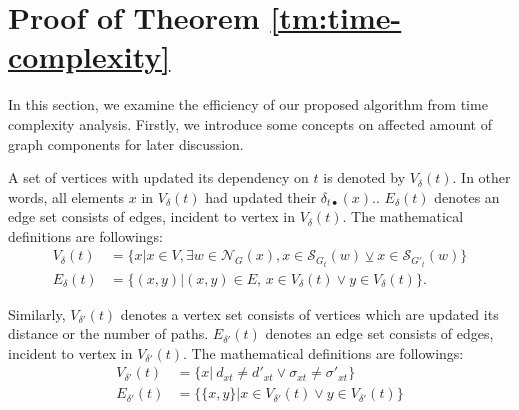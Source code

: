 \section*{Proof of Theorem \ref{tm:time-complexity}}
In this section, we examine the efficiency of our proposed algorithm from time complexity analysis.
Firstly, we introduce some concepts on affected amount of graph components for later discussion.

\begin{definition}
  A set of vertices with updated its dependency on $t$ is denoted by $V_\delta(t)$. In other words, all elements $x$ in $V_\delta(t)$ had updated their $\delta_{t\bullet}(x)$..
  $E_\delta(t)$ denotes an edge set consists of edges, incident to vertex in $V_\delta(t)$.
  The mathematical definitions are followings:
  \begin{equation*}
    \begin{aligned}
      V_\delta(t)&=\{x|x\in V,\exists w\in\mathcal{N}_G(x),
      x\in\mathcal{S}_{G_t}(w)\veebar x\in\mathcal{S}_{G'_t}(w)\}\\
      E_\delta(t)&=\{(x,y)|(x,y)\in E,\,x\in V_\delta(t)\lor y\in V_\delta(t)\}.
    \end{aligned}
  \end{equation*}

  Similarly, $V_{\delta'}(t)$ denotes a vertex set consists of vertices which are updated its distance or the number of paths.
  $E_{\delta'}(t)$ denotes an edge set consists of edges, incident to vertex in $V_{\delta'}(t)$.
  The mathematical definitions are followings:
  \begin{equation*}
    \begin{aligned}
      V_{\delta'}(t)&=\{x|\:d_{xt}\neq d'_{xt}\lor\sigma_{xt}\neq\sigma'_{xt}\} \\
      E_{\delta'}(t)&=\{\{x,y\}|x\in V_{\delta'}(t)\lor y\in V_{\delta'}(t)\}
    \end{aligned}
  \end{equation*}
\end{definition}

